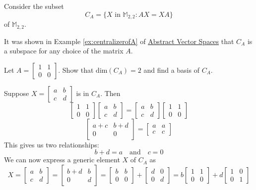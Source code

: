 \documentclass{ximera}
\begin{document}
\begin{example}\label{ex:CAbasis}
Consider the subset
\begin{equation*}
C_A = \{X \mbox{ in } \mathbb{M}_{2,2} : AX = XA \}
\end{equation*}
of $\mathbb{M}_{2,2}$. 

It was shown in Example \ref{ex:centralizerofA} of \href{https://ximera.osu.edu/oerlinalg/LinearAlgebra/VSP-0050/main}{Abstract Vector Spaces} that $C_A$ is a subspace for any choice of the matrix $A$.

Let $A = 
\begin{bmatrix}
1 & 1 \\
0 & 0
\end{bmatrix}$.
Show that $\mbox{dim}(C_A) = 2$ and find a basis of $C_A$.

\begin{explanation}
 Suppose $X = 
\begin{bmatrix}
a & b \\
c & d
\end{bmatrix}$
 is in $C_A$.  
 Then
 $$\begin{bmatrix}1&1\\0&0\end{bmatrix}\begin{bmatrix}a&b\\c&d\end{bmatrix}=\begin{bmatrix}a&b\\c&d\end{bmatrix}\begin{bmatrix}1&1\\0&0\end{bmatrix}$$
 $$\begin{bmatrix}a+c&b+d\\0&0\end{bmatrix}=\begin{bmatrix}a&a\\c&c\end{bmatrix}$$
 This gives us two relationships:  
 $$b+d=a\quad\text{and}\quad c=0$$
 We can now express a generic element $X$ of $C_A$ as
 $$X=\begin{bmatrix}a&b\\c&d\end{bmatrix}=\begin{bmatrix}b+d&b\\0&d\end{bmatrix}=\begin{bmatrix}b&b\\0&0\end{bmatrix}+\begin{bmatrix}d&0\\0&d\end{bmatrix}=b\begin{bmatrix}1&1\\0&0\end{bmatrix}+d\begin{bmatrix}1&0\\0&1\end{bmatrix}$$
 

\end{explanation}
\end{example}
\end{document}
